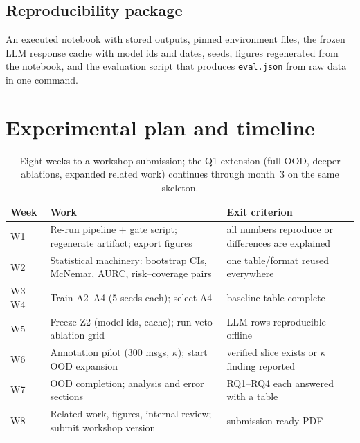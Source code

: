 \documentclass[11pt]{article}
\begin{document}
\subsection{Reproducibility package}
An executed notebook with stored outputs, pinned environment files, the frozen
LLM response cache with model ids and dates, seeds, figures regenerated from
the notebook, and the evaluation script that produces \texttt{eval.json} from
raw data in one command.

\section{Experimental plan and timeline}
\begin{table}[htbp]
\centering
\small
\begin{tabular}{@{}lp{7.2cm}p{6.3cm}@{}}
\toprule
Week & Work & Exit criterion \\
\midrule
W1 & Re-run pipeline + gate script; regenerate artifact; export figures
   & all numbers reproduce or differences are explained \\
W2 & Statistical machinery: bootstrap CIs, McNemar, AURC, risk--coverage pairs
   & one table/format reused everywhere \\
W3--W4 & Train A2--A4 (5 seeds each); select A4
   & baseline table complete \\
W5 & Freeze Z2 (model ids, cache); run veto ablation grid
   & LLM rows reproducible offline \\
W6 & Annotation pilot (300 msgs, $\kappa$); start OOD expansion
   & verified slice exists or $\kappa$ finding reported \\
W7 & OOD completion; analysis and error sections
   & RQ1--RQ4 each answered with a table \\
W8 & Related work, figures, internal review; submit workshop version
   & submission-ready PDF \\
\bottomrule
\end{tabular}
\caption{Eight weeks to a workshop submission; the Q1 extension (full OOD,
deeper ablations, expanded related work) continues through month~3 on the same
skeleton.}
\label{tab:timeline}
\end{table}
\end{document}
